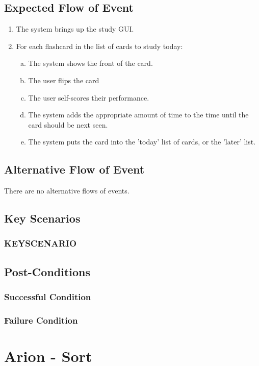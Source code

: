 \documentclass{scrreprt}
\begin{document}
\section{Expected Flow of Event}
\begin{enumerate}[1.]
    \item The system brings up the study GUI.
    \item For each flashcard in the list of cards to study today:
    \begin{enumerate}[a.]
        \item The system shows the front of the card.
        \item The user flips the card
        \item The user self-scores their performance.
        \item The system adds the appropriate amount of time to the time until the card should be next seen.
        \item The system puts the card into the 'today' list of cards, or the 'later' list.
    \end{enumerate}
\end{enumerate}

\section{Alternative Flow of Event}
There are no alternative flows of events.

\section{Key Scenarios}
    \subsection{KEYSCENARIO}

\section{Post-Conditions}
    \subsection{Successful Condition}
    
    \subsection{Failure Condition}


\chapter{Arion - Sort}
\end{document}
